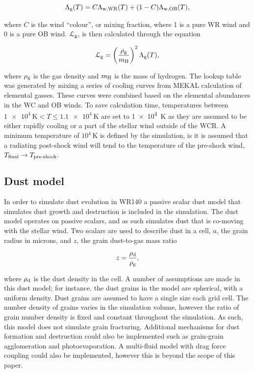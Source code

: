 \begin{equation}
  \Lambda_\text{g}(T) = C\Lambda_\text{w,WR}(T) + (1-C)\Lambda_\text{w,OB}(T) , 
\end{equation}

\noindent
where $C$ is the wind ``colour'', or mixing fraction, where 1 is a pure WR wind and 0 is a pure OB wind.
$\mathcal{L}_\text{g}$, is then calculated through the equation

\begin{equation}
  \mathcal{L}_\text{g} = \left(\frac{\rho_\text{g}}{m_\text{H}}\right)^2 \Lambda_\text{g}(T),
\end{equation}

\noindent
where $\rho_\text{g}$ is the gas density and $m_\text{H}$ is the mass of hydrogen.
The lookup table was generated by mixing a series of cooling curves from MEKAL calculation of elemental gasses.
These curves were combined based on the elemental abundances in the WC and OB winds.
To save calculation time, temperatures between $\SI{1e4}{\kelvin} < T \leq \SI{1.1e4}{\kelvin}$ are set to \SI{1e4}{\kelvin} as they are assumed to be either rapidly cooling or a part of the stellar wind outside of the WCR.
A minimum temperature of $10^4 \, \si{\kelvin}$ is defined by the simulation, is it is assumed that a radiating post-shock wind will tend to the temperature of the pre-shock wind, $T_\text{final} \rightarrow T_\text{pre-shock}$.

\subsection{Dust model}
\label{sec:dust-model}

In order to simulate dust evolution in WR140 a passive scalar dust model that simulates dust growth and destruction is included in the simulation.
The dust model operates on passive scalars, and as such simulates dust that is co-moving with the stellar wind.
Two scalars are used to describe dust in a cell, $a$, the grain radius in microns, and $z$, the grain dust-to-gas mass ratio

\begin{equation}
  z = \frac{\rho_\text{d}}{\rho_\text{g}},
\end{equation}

\noindent
where $\rho_\text{d}$ is the dust density in the cell.
A number of assumptions are made in this dust model; for instance, the dust grains in the model are spherical, with a uniform density.
Dust grains are assumed to have a single size each grid cell.
The number density of grains varies in the simulation volume, however the ratio of grain number density is fixed and constant throughout the simulation.
As such, this model does not simulate grain fracturing.
Additional mechanisms for dust formation and destruction could also be implemented such as grain-grain agglomeration and photoevaporation.
A multi-fluid model with drag force coupling could also be implemented, however this is beyond the scope of this paper.

